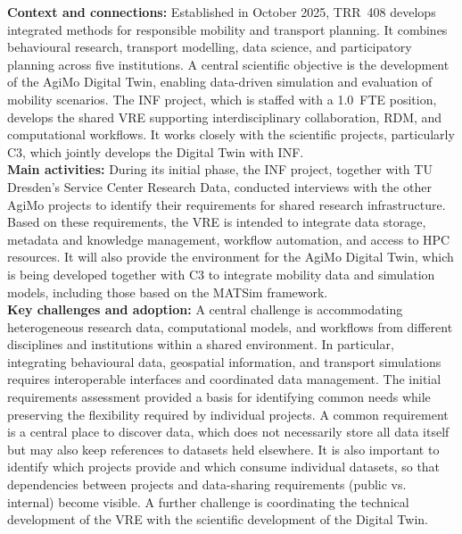 \documentclass{eceasst}
\begin{document}
\noindent\textbf{Context and connections:}
Established in October 2025, TRR~408 develops integrated
methods for responsible mobility and transport planning.
It combines behavioural research, transport modelling,
data science, and participatory planning across five
institutions. A central scientific objective is the
development of the AgiMo Digital Twin, enabling
data-driven simulation and evaluation of mobility
scenarios.
The INF project, which is staffed with a 1.0~FTE position, develops the shared VRE supporting interdisciplinary
collaboration, RDM, and
computational workflows. It works closely with the
scientific projects, particularly C3, which jointly
develops the Digital Twin with INF.
\\
\noindent\textbf{Main activities:}
During its initial phase, the INF project, together
with TU Dresden's Service Center Research Data,
conducted interviews with the other AgiMo projects
to identify their requirements for shared research
infrastructure.
Based on these requirements, the VRE is intended to
integrate data storage, metadata and knowledge
management, workflow automation, and access to HPC resources.
It will also provide the environment for the
AgiMo Digital Twin, which is being developed
together with C3 to integrate mobility data
and simulation models, including those based
on the MATSim framework.
\\
\noindent\textbf{Key challenges and adoption:}
A central challenge is accommodating heterogeneous
research data, computational models, and workflows
from different disciplines and institutions within
a shared environment. In particular, integrating
behavioural data, geospatial information, and
transport simulations requires interoperable
interfaces and coordinated data management.
The initial requirements assessment provided a
basis for identifying common needs while
preserving the flexibility required by individual
projects.
A common requirement is a central place
to discover data, which does not necessarily store
all data itself but may also keep references to datasets
held elsewhere. It is also important to identify
which projects provide and which consume individual
datasets, so that dependencies between projects
and data-sharing requirements (public vs. internal)
become visible.
A further challenge is coordinating
the technical development of the VRE with the
scientific development of the Digital Twin.
\end{document}
